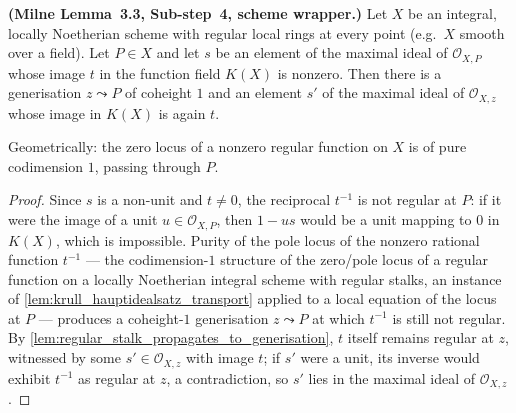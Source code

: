 \begin{lemma}
  \label{lem:milne33_diagonal_vanishing_purity}

  \textbf{(Milne Lemma~3.3, Sub-step~4, scheme wrapper.)} Let \(X\) be an
  integral, locally Noetherian scheme with regular local rings at every point
  (e.g.\ \(X\) smooth over a field). Let \(P \in X\) and let \(s\) be an
  element of the maximal ideal of \(\mathcal O_{X,P}\) whose image \(t\) in
  the function field \(K(X)\) is nonzero. Then there is a generisation
  \(z \leadsto P\) of coheight \(1\) and an element \(s'\) of the maximal
  ideal of \(\mathcal O_{X,z}\) whose image in \(K(X)\) is again \(t\).

  Geometrically: the zero locus of a nonzero regular function on \(X\) is of
  pure codimension \(1\), passing through \(P\).
\end{lemma}
\begin{proof}\leanok
  Since \(s\) is a non-unit and \(t \neq 0\), the reciprocal \(t^{-1}\) is not
  regular at \(P\): if it were the image of a unit \(u \in \mathcal O_{X,P}\),
  then \(1 - us\) would be a unit mapping to \(0\) in \(K(X)\), which is
  impossible. Purity of the pole locus of the nonzero rational function
  \(t^{-1}\) --- the codimension-\(1\) structure of the zero/pole locus of a
  regular function on a locally Noetherian integral scheme with regular
  stalks, an instance of \cref{lem:krull_hauptidealsatz_transport} applied to
  a local equation of the locus at \(P\) --- produces a coheight-\(1\)
  generisation \(z \leadsto P\) at which \(t^{-1}\) is still not regular. By
  \cref{lem:regular_stalk_propagates_to_generisation}, \(t\) itself remains
  regular at \(z\), witnessed by some \(s' \in \mathcal O_{X,z}\) with image
  \(t\); if \(s'\) were a unit, its inverse would exhibit \(t^{-1}\) as
  regular at \(z\), a contradiction, so \(s'\) lies in the maximal ideal of
  \(\mathcal O_{X,z}\).
\end{proof}

